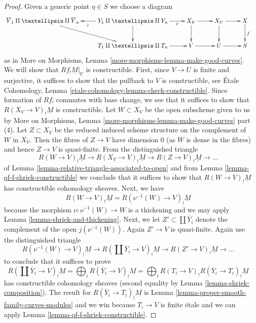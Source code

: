 \documentclass{stacks-project}
\theoremstyle{plain}
\theoremstyle{definition}
\theoremstyle{remark}
\numberwithin{equation}{subsection}
\begin{document}
\begin{proof}
\medskip\noindent
Given a generic point $\eta \in S$ we choose a diagram
$$
\xymatrix{
\overline{Y}_1 \amalg \ldots \amalg \overline{Y}_n \ar[rd] &
Y_1 \amalg \ldots \amalg Y_n \ar[r]_-\nu \ar[d] \ar[l]^j &
X_V \ar[r] \ar[d] &
X_U \ar[r] \ar[d] &
X \ar[d]^f \\
& T_1 \amalg \ldots \amalg T_n \ar[r] &
V \ar[r] &
U \ar[r] &
S
}
$$
as in More on Morphisms, Lemma \ref{more-morphisms-lemma-make-good-curves}.
We will show that $Rf_!\underline{M}|_U$ is constructible.
First, since $V \to U$ is finite and surjective, it suffices
to show that the pullback to $V$ is constructible, see
\'Etale Cohomology, Lemma \ref{etale-cohomology-lemma-check-constructible}.
Since formation of $Rf_!$ commutes with base change, we
see that it suffices to show that
$R(X_V \to V)_!\underline{M}$ is constructible.
Let $W \subset X_V$ be the open subscheme given to us by
More on Morphisms, Lemma \ref{more-morphisms-lemma-make-good-curves} part (4).
Let $Z \subset X_V$ be the reduced induced scheme structure on
the complement of $W$ in $X_V$. Then the fibres of $Z \to V$
have dimension $0$ (as $W$ is dense in the fibres) and hence
$Z \to V$ is quasi-finite. From the distinguished triangle
$$
R(W \to V)_!\underline{M} \to
R(X_V \to V)_!\underline{M} \to
R(Z \to V)_!\underline{M} \to
\ldots
$$
of Lemma \ref{lemma-relative-triangle-associated-to-open} and
from Lemma \ref{lemma-qf-f-shriek-constructible}
we conclude that it suffices to show that
$R(W \to V)_!\underline{M}$ has constructible cohomology sheaves.
Next, we have
$$
R(W \to V)_!\underline{M} = R(\nu^{-1}(W) \to V)_!\underline{M}
$$
because the morphism $\nu : \nu^{-1}(W) \to W$ is a thickening
and we may apply Lemma \ref{lemma-shriek-and-thickening}.
Next, we let $Z' \subset \coprod \overline{Y}_i$ denote the
complement of the open $j(\nu^{-1}(W))$. Again $Z' \to V$ is quasi-finite.
Again use the distinguished triangle
$$
R(\nu^{-1}(W) \to V)_!\underline{M} \to
R(\coprod \overline{Y}_i \to V)_!\underline{M} \to
R(Z' \to V)_!\underline{M} \to
\ldots
$$
to conclude that it suffices to prove
$$
R(\coprod \overline{Y}_i \to V)_!\underline{M} =
\bigoplus\nolimits_i R(\overline{Y}_i \to V)_!\underline{M} =
\bigoplus\nolimits_i R(T_i \to V)_!R(\overline{Y}_i \to T_i)_!\underline{M}
$$
has constructible cohomology sheaves (second equality by
Lemma \ref{lemma-shriek-composition}).
The result for $R(\overline{Y}_i \to T_i)_!\underline{M}$
is Lemma \ref{lemma-proper-smooth-family-curves-modules}
and we win because $T_i \to V$ is finite \'etale
and we can apply Lemma \ref{lemma-qf-f-shriek-constructible}.
\end{proof}
\end{document}
